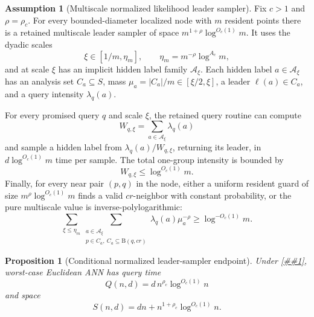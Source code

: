 \documentclass[10pt]{article}
\newcommand{\cref}[1]{\ref{##1}}
\newtheorem{proposition}[theorem]{Proposition}
\theoremstyle{definition}
\newtheorem{assumption}[theorem]{Assumption}
\newcommand{\Ball}{\mathrm{B}}
\begin{document}
\begin{assumption}[Multiscale normalized likelihood leader sampler]
   \label{asm:normalized-likelihood-leader-sampler}
   Fix \(c>1\) and \(\rho=\rho_c\).  For every bounded-diameter localized node
   with \(m\) resident points there is a retained multiscale leader sampler of
   space \(m^{1+\rho}\log^{O_c(1)}m\).  It uses the dyadic scales
   \[
      \xi\in[1/m,\eta_m],
      \qquad
      \eta_m=m^{-\rho}\log^{A_c}m,
   \]
   and at scale \(\xi\) has an implicit hidden label family
   \(\mathcal A_\xi\).  Each hidden label \(a\in\mathcal A_\xi\) has an
   analysis set \(C_a\subseteq S\), mass
   \(\mu_a=|C_a|/m\in[\xi/2,\xi]\), a leader
   \(\ell(a)\in C_a\), and a query intensity \(\lambda_q(a)\).

   For every promised query \(q\) and scale \(\xi\), the retained query
   routine can compute
   \[
      W_{q,\xi}=\sum_{a\in\mathcal A_\xi}\lambda_q(a)
   \]
   and sample a hidden label from
   \(\lambda_q(a)/W_{q,\xi}\), returning its leader, in
   \(d\log^{O_c(1)}m\) time per sample.  The total one-group intensity is
   bounded by
   \[
      W_{q,\xi}\le\log^{O_c(1)}m .
      \tag{NLS1}
   \]
   Finally, for every near pair \((p,q)\) in the node, either a uniform
   resident guard of size \(m^\rho\log^{O_c(1)}m\) finds a valid
   \(cr\)-neighbor with constant probability, or the pure multiscale value is
   inverse-polylogarithmic:
   \[
      \sum_{\xi\le\eta_m}
      \sum_{\substack{a\in\mathcal A_\xi\\
                      p\in C_a,\ C_a\subseteq\Ball(q,cr)}}
      \lambda_q(a)\mu_a^{-\rho}
      \ge
      \log^{-O_c(1)}m .
      \tag{NLS2}
   \]
\end{assumption}

\begin{proposition}[Conditional normalized leader-sampler endpoint]
   \label{prop:normalized-leader-sampler-polylog}
   Under \cref{asm:normalized-likelihood-leader-sampler}, worst-case Euclidean
   ANN has query time
   \[
      Q(n,d)=d\,n^{\rho_c}\log^{O_c(1)}n
   \]
   and space
   \[
      S(n,d)=dn+n^{1+\rho_c}\log^{O_c(1)}n .
   \]
\end{proposition}
\end{document}
